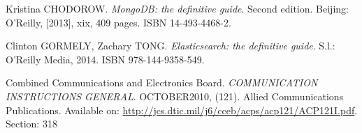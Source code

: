 \begin{thebibliography}{99}
	Kristina CHODOROW. \textit{MongoDB: the definitive guide}. Second edition. 
	Beijing: O'Reilly, [2013], xix, 409 pages. ISBN 14-493-4468-2. 
	
	Clinton GORMELY, Zachary TONG. \textit{Elasticsearch: the definitive guide}. S.l.: 
	O'Reilly Media, 2014. ISBN 978-144-9358-549. 
	
	Combined Communications and Electronics Board. 
	\textit{COMMUNICATION INSTRUCTIONS GENERAL}. OCTOBER2010, (121). 
	Allied Communications Publications. 
	Available on: \url{http://jcs.dtic.mil/j6/cceb/acps/acp121/ACP121I.pdf}.
	Section: 318

	

		

\end{thebibliography}
